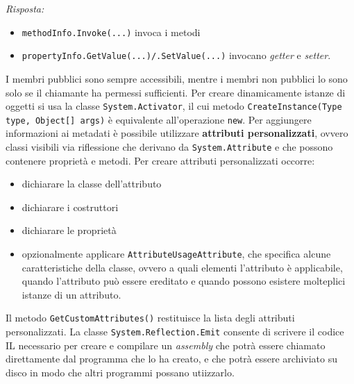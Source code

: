 \documentclass{article}
\newenvironment{solution}
    {\textit{Risposta:}}
    {}
\begin{document}
\begin{solution}
\begin{itemize}
	\item \texttt{methodInfo.Invoke(...)} invoca i metodi
	\item \texttt{propertyInfo.GetValue(...)/.SetValue(...)} invocano \textit{getter} e \textit{setter}.
\end{itemize}
I membri pubblici sono sempre accessibili, mentre i membri non pubblici lo sono solo se il chiamante ha permessi sufficienti.
Per creare dinamicamente istanze di oggetti si usa la classe \texttt{System.Activator}, il cui metodo \texttt{CreateInstance(Type type, Object[] args)} è equivalente all'operazione \texttt{new}.
\newline\newline
Per aggiungere informazioni ai metadati è possibile utilizzare \textbf{attributi personalizzati}, ovvero classi visibili via riflessione che derivano da \texttt{System.Attribute} e che possono contenere proprietà e metodi.
\newline
Per creare attributi personalizzati occorre:
\begin{itemize}
	\item dichiarare la classe dell'attributo
	\item dichiarare i costruttori
	\item dichiarare le proprietà
	\item opzionalmente applicare \texttt{AttributeUsageAttribute}, che specifica alcune caratteristiche della classe, ovvero a quali elementi l'attributo è applicabile, quando l'attributo può essere ereditato e quando possono esistere molteplici istanze di un attributo.
\end{itemize}
Il metodo \texttt{GetCustomAttributes()} restituisce la lista degli attributi personalizzati.
\newline
La classe \texttt{System.Reflection.Emit} consente di scrivere il codice IL necessario per creare e compilare un \textit{assembly} che potrà essere chiamato direttamente dal programma che lo ha creato, e che potrà essere archiviato su disco in modo che altri programmi possano utiizzarlo.
\end{solution}
\end{document}
